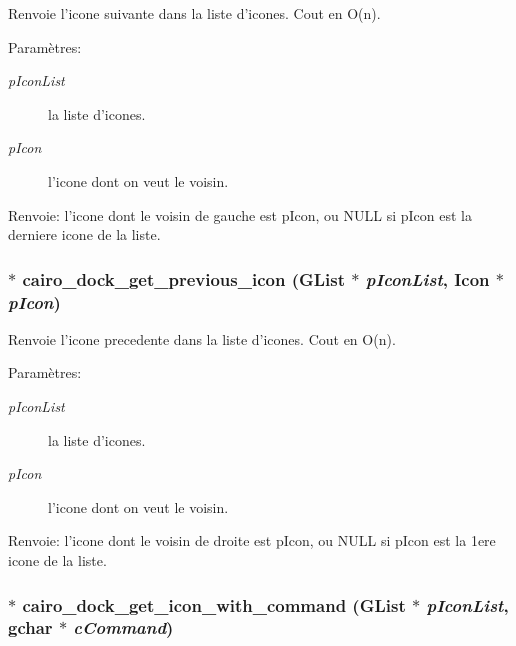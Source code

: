Renvoie l'icone suivante dans la liste d'icones. Cout en O(n). \begin{Desc}
\item[Paramètres:]
\begin{description}
\item[{\em pIconList}]la liste d'icones. \item[{\em pIcon}]l'icone dont on veut le voisin. \end{description}
\end{Desc}
\begin{Desc}
\item[Renvoie:]l'icone dont le voisin de gauche est pIcon, ou NULL si pIcon est la derniere icone de la liste. \end{Desc}
\subsubsection{$\ast$ cairo\_\-dock\_\-get\_\-previous\_\-icon (GList $\ast$ {\em pIconList}, {\bf Icon} $\ast$ {\em pIcon})}\label{cairo-dock-icons_8h_da24c66ec41597d0fa95a0b6a2ac1c2f}


Renvoie l'icone precedente dans la liste d'icones. Cout en O(n). \begin{Desc}
\item[Paramètres:]
\begin{description}
\item[{\em pIconList}]la liste d'icones. \item[{\em pIcon}]l'icone dont on veut le voisin. \end{description}
\end{Desc}
\begin{Desc}
\item[Renvoie:]l'icone dont le voisin de droite est pIcon, ou NULL si pIcon est la 1ere icone de la liste. \end{Desc}
\subsubsection{$\ast$ cairo\_\-dock\_\-get\_\-icon\_\-with\_\-command (GList $\ast$ {\em pIconList}, gchar $\ast$ {\em cCommand})}\label{cairo-dock-icons_8h_f472e108228239776b9074576813cf9e}


